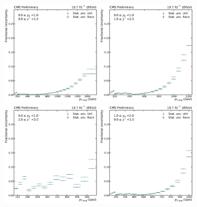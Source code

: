 \begin{figure}[htbp]
    \centering
    \includegraphics[width=0.45\textwidth]{figures/measurement/statunc_fractional_yb0ys0.pdf}\hfill
    \includegraphics[width=0.45\textwidth]{figures/measurement/statunc_fractional_yb0ys1.pdf}
    \includegraphics[width=0.45\textwidth]{figures/measurement/statunc_fractional_yb0ys2.pdf}\hfill
    \includegraphics[width=0.45\textwidth]{figures/measurement/statunc_fractional_yb1ys0.pdf}

\end{figure}
